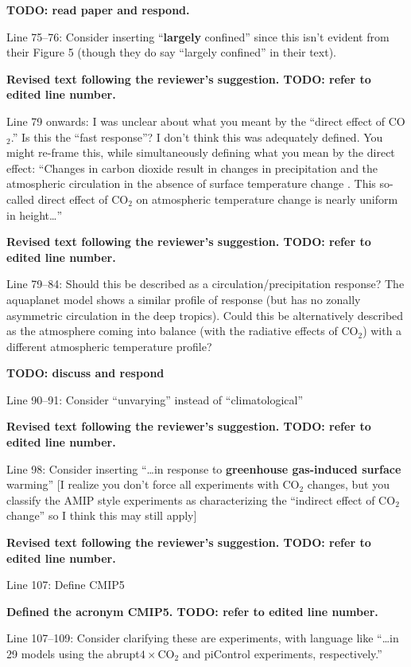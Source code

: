 \documentclass[11pt]{article}
\begin{document}
\textbf{TODO: read paper and respond.}

Line 75--76: Consider inserting ``\textbf{largely} confined'' since this isn't evident from their Figure 5 (though they do say ``largely confined'' in their text).

\textbf{Revised text following the reviewer's suggestion. TODO: refer to edited line number.}

Line 79 onwards: I was unclear about what you meant by the ``direct effect of CO\(_2\).'' Is this the ``fast response''? I don't think this was adequately defined. You might re-frame this, while simultaneously defining what you mean by the direct effect: ``Changes in carbon dioxide result in changes in precipitation and the atmospheric circulation in the absence of surface temperature change \cite{bony_robust_2013}. This so-called direct effect of CO\(_2\) on atmospheric temperature change is nearly uniform in height\ldots{}''

\textbf{Revised text following the reviewer's suggestion. TODO: refer to edited line number.}

Line 79--84: Should this be described as a circulation/precipitation response? The aquaplanet model shows a similar profile of response (but has no zonally asymmetric circulation in the deep tropics). Could this be alternatively described as the atmosphere coming into balance (with the radiative effects of CO\(_2\)) with a different atmospheric temperature profile?

\textbf{TODO: discuss and respond}

Line 90--91: Consider ``unvarying'' instead of ``climatological''

\textbf{Revised text following the reviewer's suggestion. TODO: refer to edited line number.}

Line 98: Consider inserting ``\ldots{}in response to \textbf{greenhouse gas-induced surface} warming'' [I realize you don't force all experiments with CO\(_2\) changes, but you classify the AMIP style experiments as characterizing the ``indirect effect of CO\(_2\) change'' so I think this may still apply]

\textbf{Revised text following the reviewer's suggestion. TODO: refer to edited line number.}

Line 107: Define CMIP5

\textbf{Defined the acronym CMIP5. TODO: refer to edited line number.}

Line 107--109: Consider clarifying these are experiments, with language like ``\ldots{}in 29 models using the abrupt\(4\times\)CO\(_2\) and piControl experiments, respectively.''
\end{document}
